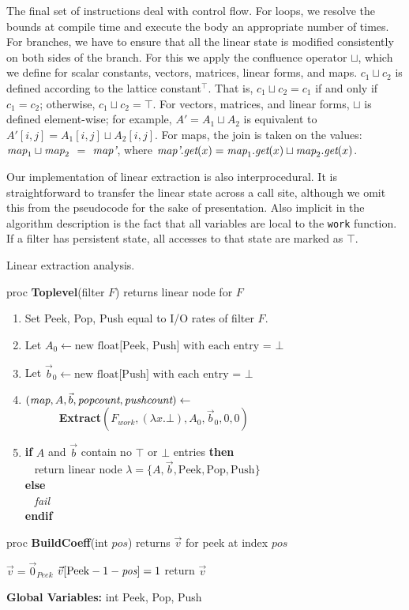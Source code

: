 The final set of instructions deal with control flow.  For loops, we
resolve the bounds at compile time and execute the body an appropriate
number of times.  For branches, we have to ensure that all the linear
state is modified consistently on both sides of the branch.  For this
we apply the confluence operator $\sqcup$, which we define for scalar
constants, vectors, matrices, linear forms, and maps.  $c_1 \sqcup
c_2$ is defined according to the lattice constant$^{\top}$.  That is,
$c_1 \sqcup c_2 = c_1$ if and only if $c_1 = c_2$; otherwise, $c_1
\sqcup c_2 = \top$.  For vectors, matrices, and linear forms, $\sqcup$
is defined element-wise; for example, $A' = A_1 \sqcup A_2$ is
equivalent to $A'[i,j] = A_1[i,j] \sqcup A_2[i,j]$.  For maps, the
join is taken on the values: $\mbox{\it map}_1 \sqcup \mbox{\it map}_2$ $=$
$\mbox{\it map'}$, where $\mbox{\it map'}.\mbox{\it get}(x) = \mbox{\it map}_1.\mbox{\it get}(x)
\sqcup \mbox{\it map}_2.\mbox{\it get}(x)$.

Our implementation of linear extraction is also interprocedural.  It
is straightforward to transfer the linear state across a call site,
although we omit this from the pseudocode for the sake of
presentation.  Also implicit in the algorithm description is the fact
that all variables are local to the {\tt work} function.  If a filter
has persistent state, all accesses to that state are marked as $\top$.

\begin{algorithm}[t]
\caption{Linear extraction analysis.\protect\label{alg:dataflow}}
proc {\bf Toplevel}(filter $F$) returns linear node for $F$
\begin{enumerate}
\item Set Peek, Pop, Push equal to I/O rates of filter $F$.
\item Let $A_{0} \leftarrow \mbox{new float[Peek, Push] with each entry =~} \bot$
\item Let ${\vec b_{0}} \leftarrow \mbox{new float[Push] with each entry =~} \bot$
\item $(\mbox{\it map}, A, {\vec b}, \mbox{\it popcount}, \mbox{\it pushcount}) \leftarrow$ \\
\verb+      +{\bf Extract}$(F_{work}, (\lambda x . \bot), A_{0}, {\vec b_{0}}, 0, 0)$
\item {\bf if} $A$ and ${\vec b}$ contain no $\top$ or $\bot$ entries {\bf then} \\
\verb+ + return linear node $\lambda = \{A, {\vec b}, \mbox{Peek}, \mbox{Pop}, \mbox{Push}\}$ \\
 {\bf else} \\
\verb+ + {\it fail} \\
 {\bf endif}
\end{enumerate}
proc {\bf BuildCoeff}(int $pos$) returns $\vec v$ for peek at index $pos$ \\ \vspace{-12pt}
\begin{algorithmic}
\STATE $\vec v = \vec 0_{Peek}$
\STATE $\vec v[\mbox{Peek}-1-\mbox{\it pos}] = 1$
\STATE return $\vec v$
\end{algorithmic}
\vspace{6pt}
{\bf Global Variables:} int Peek, Pop, Push
\end{algorithm}

